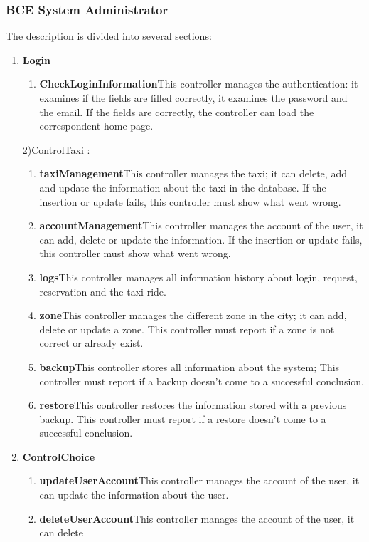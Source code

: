 \documentclass[11pt, a4paper,titlepage]{article}
\begin{document}
\subsubsection{BCE System Administrator}
The description is divided into several sections:
\begin{enumerate}
	\item \textbf{Login}
	\begin{enumerate}
		\item \textbf{CheckLoginInformation}This controller manages the authentication: it  
		examines if the fields are filled correctly, it examines the password and the email. 
		If the fields are correctly, the controller can load the correspondent home page.
	\end{enumerate}
	2)ControlTaxi :
	\begin{enumerate}
		\item \textbf{taxiManagement}This controller manages the taxi; it can delete, add and update 
		the information about the taxi in the database.
		If the insertion or update fails, this controller must show what went wrong.
		\item \textbf{accountManagement}This controller manages the account of the user, it can add, 
		delete or update the information.
		If the insertion or update fails, this controller must show what went wrong.
		\item \textbf{logs}This controller manages all information history about login, request, reservation  
		and the taxi ride.
		\item \textbf{zone}This controller manages the different zone in the city; it can add, delete 
		or update a zone.
		This controller must report if a zone is not correct or already exist.
		\item \textbf{backup}This controller stores all information about the system;
		This controller must report if a backup doesn’t come to a successful conclusion.
		\item \textbf{restore}This controller restores the information stored with a previous backup.
		This controller must report if a restore doesn’t come to a successful conclusion.
	\end{enumerate}
	\item \textbf{ControlChoice}
	\begin{enumerate}
		\item \textbf{updateUserAccount}This controller manages the account of the user, it can update 
		the information about the user.
		\item \textbf{deleteUserAccount}This controller manages the account of the user, it can delete 

\end{enumerate}
\end{enumerate}
\end{document}
